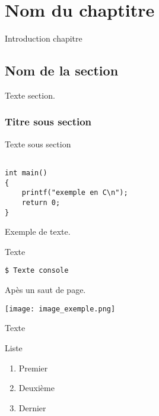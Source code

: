 
\chapter{Nom du chaptitre} %

\label{Chapitre 2} %


Introduction chapitre

\section{Nom de la section}

Texte section.
\subsection{Titre sous section}
Texte sous section
\begin{lstlisting}[frame=single,style=C]  % Start your code-block

int main()
{
	printf("exemple en C\n");
	return 0;
}
\end{lstlisting}


Exemple de texte.


%

Texte



\begin{lstlisting}[frame=single,style=Console]
$ Texte console
\end{lstlisting}
\pagebreak Apès un saut de page.


\begin{center} 
\hspace{12.45cm}
\texttt{[image: image\_exemple.png]}
\end{center}
\vspace{1cm}

Texte

Liste
\begin{enumerate}
\item Premier
\item Deuxième
\item Dernier
\end{enumerate}


 


